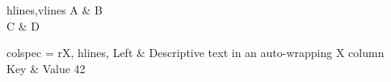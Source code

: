 \documentclass{article}
\begin{document}
\begin{tblr}{hlines,vlines}
A & B \\
C & D \\
\end{tblr}

\begin{tblr}{
  colspec = {rX},
  hlines,
}
  Left & Descriptive text in an auto-wrapping X column \\
  Key  & Value 42 \\
\end{tblr}
\end{document}
